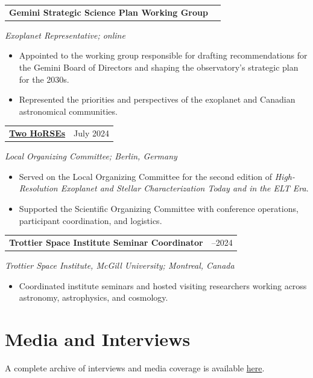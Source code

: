 \documentclass[10pt,a4paper]{article}
\makeatletter
\newcommand{\grantheading}[2]{%
\begin{tabularx}{\textwidth}{
    @{}
    >{\raggedright\arraybackslash}X
    >{\raggedleft\arraybackslash}p{4.5cm}
    @{}
}
\textbf{#1} & #2
\end{tabularx}
}
\newenvironment{lightitems}
{%
  \begin{itemize}[
      label=\textcolor{entrylight}{\textbullet},
      leftmargin=1.3em,
      itemsep=1pt,
      topsep=2pt,
      parsep=0pt
  ]
  \color{entrylight}
}
{%
  \end{itemize}
}
\makeatother
\begin{document}
\grantheading
{Gemini Strategic Science Plan Working Group}
{2024}
\emph{Exoplanet Representative; online}
\begin{lightitems}
\item
\vspace{-1.5mm}Appointed to the working group responsible for drafting recommendations for the Gemini Board of Directors and shaping the observatory's strategic plan for the 2030s.
\item
Represented the priorities and perspectives of the exoplanet and Canadian astronomical communities.
\end{lightitems}


\grantheading
{\href{https://sites.google.com/view/two-horses/}{Two HoRSEs}}
{July 2024}
\emph{Local Organizing Committee; Berlin, Germany}
\begin{lightitems}
\item
\vspace{-1.5mm}Served on the Local Organizing Committee for the second edition of
\emph{High-Resolution Exoplanet and Stellar Characterization Today and
in the ELT Era}.
\item
Supported the Scientific Organizing Committee with conference
operations, participant coordination, and logistics.
\end{lightitems}


\grantheading
{Trottier Space Institute Seminar Coordinator}
{2023--2024}
\emph{Trottier Space Institute, McGill University; Montreal, Canada}
\begin{lightitems}
\item
\vspace{-1.5mm}Coordinated institute seminars and hosted visiting researchers working
across astronomy, astrophysics, and cosmology.
\end{lightitems}

\section{Media and Interviews}

A complete archive of interviews and media coverage is available
\href{https://vigneshastro.github.io/media/} {here}.
\end{document}
